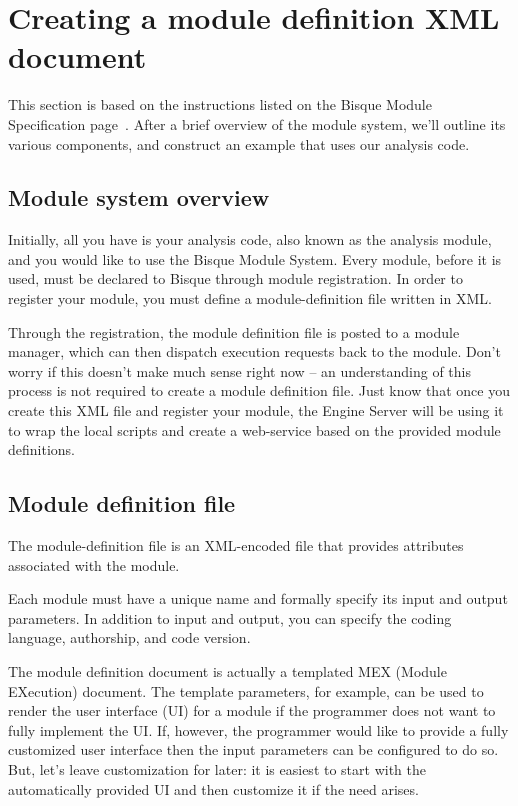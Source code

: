 \section{Creating a module definition XML document}
\label{sec:creating-module-definition-XML}

This section is based on the instructions listed on the Bisque Module Specification page~\cite{Bisque-module-specification}.
After a brief overview of the module system, we'll outline its various components, and construct an example that uses our analysis code. 


\subsection{Module system overview}
Initially, all you have is your analysis code, also known as the analysis module, and you would like to use the Bisque Module System. 
Every module, before it is used, must be declared to Bisque through module registration. In order to register your module, you must define a module-definition file written in XML.

Through the registration, the module definition file is posted to a module manager, %
which can then dispatch execution requests back to the module. Don't worry if this doesn't make much sense right now -- an understanding of this process is not required to create a module definition file. Just know that once you create this XML file and register your module, the Engine Server will be using it to wrap the local scripts and create a web-service based on the provided module definitions.


\subsection{ Module definition file}

The module-definition file is an XML-encoded file that provides attributes associated with the module. 

Each module must have a unique name and formally specify its input and output parameters. In addition to input and output, you can specify the coding language, authorship, and code version. 

The module definition document is actually a templated MEX (Module EXecution) document. The template parameters, for example, can be used to render the user interface (UI) for a module if the programmer does not want to fully implement the UI. If, however, the programmer would like to provide a fully customized user interface then the input parameters can be configured to do so. But, let's leave customization for later: it is easiest to start with the automatically provided UI and then customize it if the need arises. 

